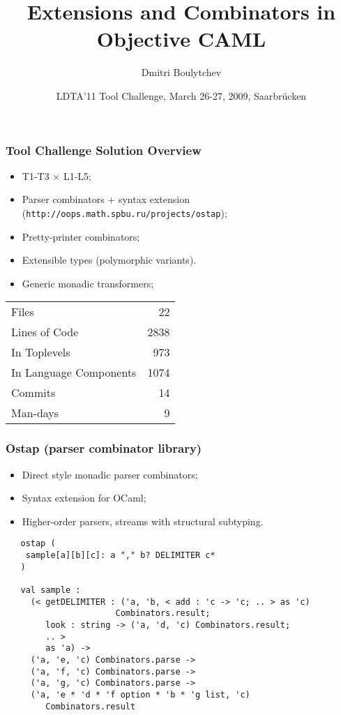 \documentclass{beamer}
\title{Extensions and Combinators in Objective CAML}
\author{Dmitri Boulytchev}
\institute{St.Petersburg State University, Russia}
\date{LDTA'11 Tool Challenge, March 26-27, 2009, Saarbr\"ucken}
\begin{document}
\sloppy
\maketitle

\begin{frame}[fragile]
  \frametitle{Tool Challenge Solution Overview}

  \begin{itemize}
    \item T1-T3 $\times$ L1-L5;
    \item Parser combinators + syntax extension (\texttt{http://oops.math.spbu.ru/projects/ostap});
    \item Pretty-printer combinators;
    \item Extensible types (polymorphic variants).     
    \item Generic monadic transformers;
  \end{itemize}

  \begin{table}
\centering

\begin{tabular}{l|r}
\hline
 Files                   &   22 \\
 Lines of Code           & 2838 \\
 In Toplevels            &  973 \\
 In Language Components  & 1074 \\
 Commits                 &   14 \\
 Man-days                &    9 \\ 
  
\hline
\end{tabular}
\end{table}

\end{frame}

\begin{frame}[fragile]
  \frametitle{Ostap (parser combinator library)}
  \begin{itemize}
     \item Direct style monadic parser combinators;
     \item Syntax extension for OCaml;
     \item Higher-order parsers, streams with structural
subtyping. 
  \end{itemize}
  \begin{lstlisting}
   ostap (
    sample[a][b][c]: a "," b? DELIMITER c*  
   )

   val sample :
     (< getDELIMITER : ('a, 'b, < add : 'c -> 'c; .. > as 'c)
                      Combinators.result;
        look : string -> ('a, 'd, 'c) Combinators.result; 
        .. >
        as 'a) ->
     ('a, 'e, 'c) Combinators.parse ->
     ('a, 'f, 'c) Combinators.parse ->
     ('a, 'g, 'c) Combinators.parse ->
     ('a, 'e * 'd * 'f option * 'b * 'g list, 'c) 
        Combinators.result
  \end{lstlisting}
\end{frame}
\end{document}
